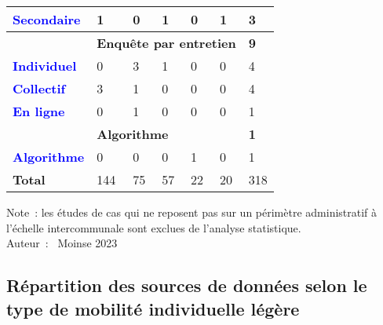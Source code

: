 \begin{table}[h]
\begin{tabular}{p{3.9cm}p{1.3cm}p{1.3cm}p{1.3cm}p{1.3cm}p{1.3cm}p{1.2cm}}
        \textcolor{blue}{\textbf{Secondaire}} & 1 & 0 & 1 & 0 & 1 & 3\\
             \hline
        & \multicolumn{5}{l}{\textbf{Enquête par entretien}} & \textbf{9}\\
        \textcolor{blue}{\textbf{Individuel}} & 0 & 3 & 1 & 0 & 0 & 4\\
        \textcolor{blue}{\textbf{Collectif}} & 3 & 1 & 0 & 0 & 0 & 4\\
        \textcolor{blue}{\textbf{En ligne}} & 0 & 1 & 0 & 0 & 0 & 1\\
            \hline
        & \multicolumn{5}{l}{\textbf{Algorithme}} & \textbf{1}\\
        \textcolor{blue}{\textbf{Algorithme}} & 0 & 0 & 0 & 1 & 0 & 1\\
            \hline
        \textbf{Total} & 144 & 75 & 57 & 22 & 20 & 318\\
        \end{tabular}
    \caption*{}
    \label{Annexe RSL tableau sources de données EPCI}
        \begin{flushright}
    \scriptsize
    Note~: les études de cas qui ne reposent pas sur un périmètre administratif à l'échelle intercommunale sont exclues de l'analyse statistique.
    \\
    Auteur~: \textcopyright~Moinse 2023
        \end{flushright}
        \end{table}

    \newpage
\subsection{Répartition des sources de données selon le type de mobilité individuelle légère}
    \label{donnees-ouvertes:rsl_publications_sources_donnees_par_type_mobilite_individuelle_legere}

